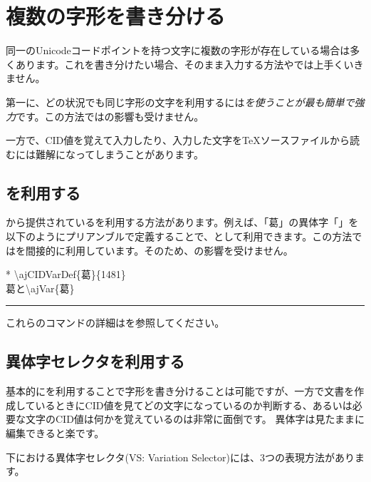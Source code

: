\documentclass[../supplement]{subfiles}
\begin{document}
\section{複数の字形を書き分ける}

同一のUnicodeコードポイントを持つ文字に複数の字形が存在している場合は多くあります。これを書き分けたい場合、そのまま入力する方法やでは上手くいきません。

第一に、どの状況でも同じ字形の文字を利用するには\emph{を使うことが最も簡単で強力}です。この方法ではの影響も受けません。

一方で、CID値を覚えて入力したり、入力した文字を{\TeX}ソースファイルから読むには難解になってしまうことがあります。

\subsection{\texorpdfstring{}{{\textbackslash}ajVar}を利用する}

から提供されているを利用する方法があります。例えば、「葛」の異体字「」を以下のようにプリアンブルで定義することで、として利用できます。この方法ではを間接的に利用しています。そのため、の影響を受けません。

\begin{demosource}*
  {\textbackslash}ajCIDVarDef\{葛\}\{1481\}\\
  \vfil
  葛と{\textbackslash}ajVar\{葛\}
  \tcblower
  \\[-1.3zw]
  {\color{gray9}\rule{\linewidth}{0.15zw}}
  \large
\end{demosource}

これらのコマンドの詳細はを参照してください。

\subsection{異体字セレクタを利用する}

基本的にを利用することで字形を書き分けることは可能ですが、一方で文書を作成しているときにCID値を見てどの文字になっているのか判断する、あるいは必要な文字のCID値は何かを覚えているのは非常に面倒です。
異体字は見たままに編集できると楽です。

{\upLaTeXdvipdfmx}下における異体字セレクタ(VS: Variation Selector)には、3つの表現方法があります。
\end{document}
